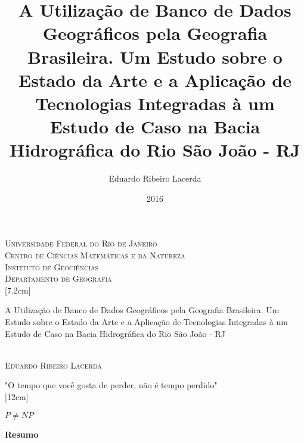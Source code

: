 \documentclass[12pt,a4paper,openany]{book} %
\title{A Utilização de Banco de Dados Geográficos pela Geografia Brasileira. Um Estudo sobre o Estado da Arte e a Aplicação de Tecnologias Integradas à um Estudo de Caso na Bacia Hidrográfica do Rio São João - RJ}
\author{Eduardo Ribeiro Lacerda}
\date{2016}
\begin{document}
	
	\begin{titlepage}
		
		\begin{center}
			\textsc{\large Universidade Federal do Rio de Janeiro} \\
			\textsc{\large Centro de Ciências Matemáticas e da Natureza} \\
			\textsc{\large Instituto de Geociências} \\
			\textsc{\large Departamento de Geografia} \\
			[7.2cm]
		\end{center}
		\Large{A Utilização de Banco de Dados Geográficos pela Geografia Brasileira. Um Estudo sobre o Estado da Arte e a Aplicação de Tecnologias Integradas à um Estudo de Caso na Bacia Hidrográfica do Rio São João - RJ} \\
		[6cm] \\
		\begin{flushright}
			\textsc{\large Eduardo Ribeiro Lacerda \\}
		\end{flushright} 
	\end{titlepage}
	
	
	\newpage
	\begin{center}
		\vspace*{\fill}
		"O tempo que você gosta de perder, não é tempo perdido" \\ 
		[12cm]
	\end{center}
	
	\newpage
	\begin{center}
		\vspace*{\fill}
		$ P \neq NP $ \\ 
		[12cm]
	\end{center}

	\tableofcontents
	\listoffigures
	\listoftables
	
	\newpage
	\begin{center}
		\textbf{\LARGE Resumo}
	\end{center}
	
\end{document}

